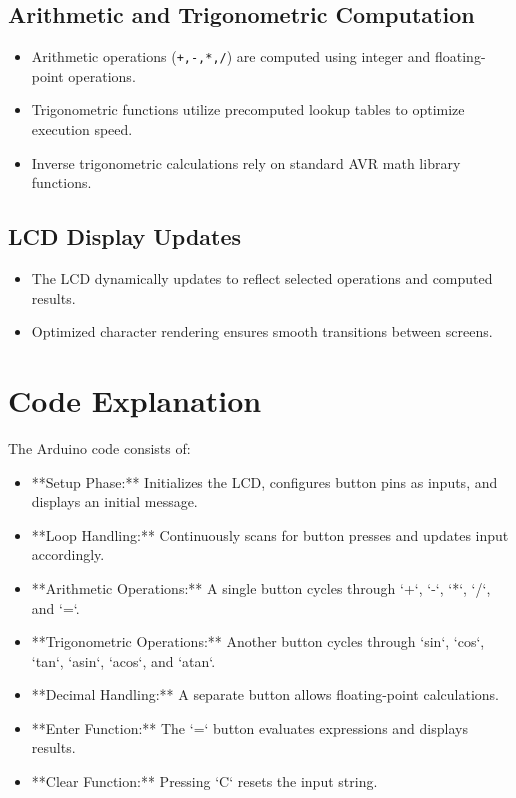 \documentclass[journal]{IEEEtran}
\begin{document}
\subsection{Arithmetic and Trigonometric Computation}
\begin{itemize}
    \item Arithmetic operations (\texttt{+,-,*,/}) are computed using integer and floating-point operations.
    \item Trigonometric functions utilize precomputed lookup tables to optimize execution speed.
    \item Inverse trigonometric calculations rely on standard AVR math library functions.
\end{itemize}

\subsection{LCD Display Updates}
\begin{itemize}
    \item The LCD dynamically updates to reflect selected operations and computed results.
    \item Optimized character rendering ensures smooth transitions between screens.
\end{itemize}

\section{Code Explanation}
The Arduino code consists of:
\begin{itemize}
    \item **Setup Phase:** Initializes the LCD, configures button pins as inputs, and displays an initial message.
    \item **Loop Handling:** Continuously scans for button presses and updates input accordingly.
    \item **Arithmetic Operations:** A single button cycles through `+`, `-`, `*`, `/`, and `=`.
    \item **Trigonometric Operations:** Another button cycles through `sin`, `cos`, `tan`, `asin`, `acos`, and `atan`.
    \item **Decimal Handling:** A separate button allows floating-point calculations.
    \item **Enter Function:** The `=` button evaluates expressions and displays results.
    \item **Clear Function:** Pressing `C` resets the input string.
\end{itemize}
\end{document}
